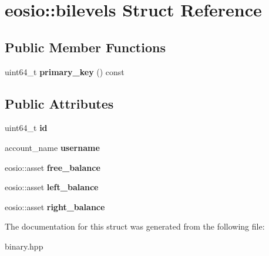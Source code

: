 \hypertarget{structeosio_1_1bilevels}{}\section{eosio\+:\+:bilevels Struct Reference}
\label{structeosio_1_1bilevels}
\subsection*{Public Member Functions}
\begin{DoxyCompactItemize}
\item 
\mbox{\label{structeosio_1_1bilevels_a3819509b2e0d2013bcc5d78e3cc62a4d}} 
uint64\+\_\+t {\bfseries primary\+\_\+key} () const
\end{DoxyCompactItemize}
\subsection*{Public Attributes}
\begin{DoxyCompactItemize}
\item 
\mbox{\label{structeosio_1_1bilevels_acdaf350a20d8ccbb1e00ab4da593ef42}} 
uint64\+\_\+t {\bfseries id}
\item 
\mbox{\label{structeosio_1_1bilevels_a0ad0de866b5da4efe77df16c54b2ce10}} 
account\+\_\+name {\bfseries username}
\item 
\mbox{\label{structeosio_1_1bilevels_abdcc5744789e33bd41e6c15027eae780}} 
eosio\+::asset {\bfseries free\+\_\+balance}
\item 
\mbox{\label{structeosio_1_1bilevels_a7247bb6ea06d3648a60a17e3a68c1917}} 
eosio\+::asset {\bfseries left\+\_\+balance}
\item 
\mbox{\label{structeosio_1_1bilevels_a560b472e102e935af2ebdd3edac31b3c}} 
eosio\+::asset {\bfseries right\+\_\+balance}
\end{DoxyCompactItemize}


The documentation for this struct was generated from the following file\+:\begin{DoxyCompactItemize}
\item 
binary.\+hpp\end{DoxyCompactItemize}
